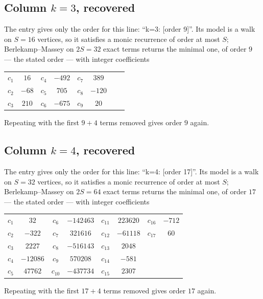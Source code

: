 \documentclass[11pt,a4paper]{article}
\theoremstyle{plain}
\theoremstyle{definition}
\begin{document}
\subsection*{Column $k=3$, recovered}
The entry gives only the order for this line: ``k=3: [order 9]''. Its model is a walk on
$S=16$ vertices, so it satisfies a monic recurrence of order at most $S$;
Berlekamp--Massey on $2S=32$ exact terms returns the minimal one, of order
$9$ --- the stated order --- with integer coefficients
\begin{center}\small\begin{tabular}{cccccccc}
$c_{1}$ & $16$ & $c_{4}$ & $-492$ & $c_{7}$ & $389$ &  &  \\
$c_{2}$ & $-68$ & $c_{5}$ & $705$ & $c_{8}$ & $-120$ &  &  \\
$c_{3}$ & $210$ & $c_{6}$ & $-675$ & $c_{9}$ & $20$ &  &  \\
\end{tabular}\end{center}
Repeating with the first $9+4$ terms removed gives order $9$ again.

\subsection*{Column $k=4$, recovered}
The entry gives only the order for this line: ``k=4: [order 17]''. Its model is a walk on
$S=32$ vertices, so it satisfies a monic recurrence of order at most $S$;
Berlekamp--Massey on $2S=64$ exact terms returns the minimal one, of order
$17$ --- the stated order --- with integer coefficients
\begin{center}\small\begin{tabular}{cccccccc}
$c_{1}$ & $32$ & $c_{6}$ & $-142463$ & $c_{11}$ & $223620$ & $c_{16}$ & $-712$ \\
$c_{2}$ & $-322$ & $c_{7}$ & $321616$ & $c_{12}$ & $-61118$ & $c_{17}$ & $60$ \\
$c_{3}$ & $2227$ & $c_{8}$ & $-516143$ & $c_{13}$ & $2048$ &  &  \\
$c_{4}$ & $-12086$ & $c_{9}$ & $570208$ & $c_{14}$ & $-581$ &  &  \\
$c_{5}$ & $47762$ & $c_{10}$ & $-437734$ & $c_{15}$ & $2307$ &  &  \\
\end{tabular}\end{center}
Repeating with the first $17+4$ terms removed gives order $17$ again.
\end{document}
